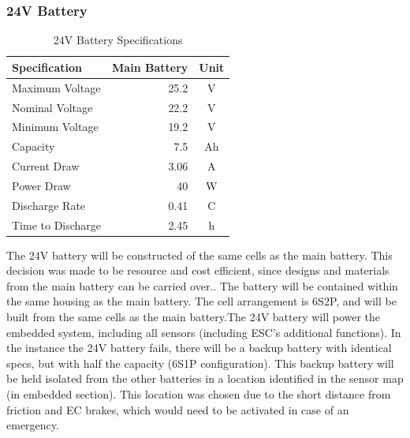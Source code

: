 \documentclass{report}
\begin{document}
    \subsubsection{24V Battery}
    \begin{table}[H]
        \centering
        \begin{tabular}{@{}lrc@{}} \toprule
            Specification & Main Battery & Unit\\ \midrule
            Maximum Voltage & 25.2 & \si{V}\\
            Nominal Voltage & 22.2 & \si{V}\\
            Minimum Voltage & 19.2 & \si{V}\\
            Capacity & 7.5 & \si{Ah}\\
            Current Draw & 3.06 & \si{A}\\
            Power Draw & 40 & \si{W}\\
            Discharge Rate & 0.41 & \si{C}\\
            Time to Discharge & 2.45 & \si{h}\\ \bottomrule
        \end{tabular}
        \caption{24V Battery Specifications}
    \end{table}
    The 24V battery will be constructed of the same cells as the main battery. This decision was made to be resource and cost efficient, since designs and materials from the main battery can be carried over.. The battery will be contained within the same housing as the main battery. The cell arrangement is 6S2P, and will be built from the same cells as the main battery.The 24V battery will power the embedded system, including all sensors (including ESC’s additional functions). In the instance the 24V battery fails, there will be a backup battery with identical specs, but with half the capacity (6S1P configuration). This backup battery will be held isolated from the other batteries in  a location identified in the sensor map (in embedded section). This location was chosen due to the short distance from friction and EC brakes, which would need to be activated in case of an emergency.
\end{document}
